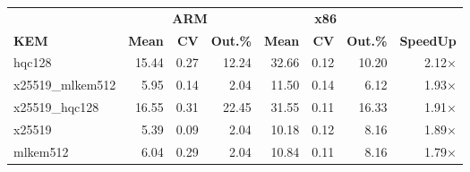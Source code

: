 \begin{table}[!ht]
\begin{tabular}{lrrr|rrr|r}
 \toprule
& \multicolumn{3}{c}{\bfseries ARM} & \multicolumn{3}{c}{\bfseries x86} &\\
\cmidrule(lr){2-4} \cmidrule(lr){5-7}
\textbf{KEM} & \textbf{Mean} & \textbf{CV} & \textbf{Out.\%} & \textbf{Mean} & \textbf{CV} & \textbf{Out.\%} & \textbf{SpeedUp}\\
\midrule
hqc128 & 15.44 & 0.27 & 12.24 & 32.66 & 0.12 & 10.20 & 2.12× \\
x25519_mlkem512 & 5.95 & 0.14 & 2.04 & 11.50 & 0.14 & 6.12 & 1.93× \\
x25519_hqc128 & 16.55 & 0.31 & 22.45 & 31.55 & 0.11 & 16.33 & 1.91× \\
x25519 & 5.39 & 0.09 & 2.04 & 10.18 & 0.12 & 8.16 & 1.89× \\
mlkem512 & 6.04 & 0.29 & 2.04 & 10.84 & 0.11 & 8.16 & 1.79× \\
\bottomrule
\end{tabular}
\end{table}
